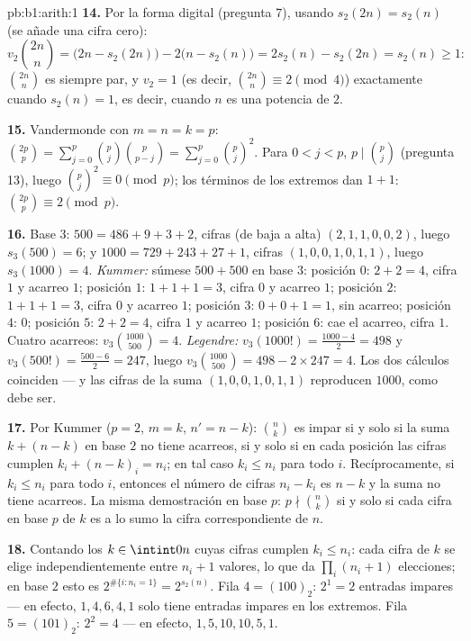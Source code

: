 \begin{solution}{pb:b1:arith:1}
\textbf{14.} Por la forma digital (pregunta 7), usando
$s_2(2n) = s_2(n)$ (se añade una cifra cero):
\[
v_2\binom{2n}n = \bigl(2n - s_2(2n)\bigr) - 2\bigl(n -
s_2(n)\bigr) = 2s_2(n) - s_2(2n) = s_2(n) \geq 1 :
\]
$\binom{2n}n$ es siempre par, y $v_2 = 1$ (es decir,
$\binom{2n}n \equiv 2 \pmod 4$) exactamente cuando $s_2(n) = 1$, es
decir, cuando $n$ es una potencia de $2$.

\textbf{15.} Vandermonde con $m = n = k = p$: $\binom{2p}p =
\sum_{j=0}^p \binom pj\binom p{p-j} = \sum_{j=0}^p \binom pj^2$. Para
$0 < j < p$, $p \mid \binom pj$ (pregunta 13), luego
$\binom pj^2 \equiv 0 \pmod p$; los términos de los extremos dan
$1 + 1$: $\binom{2p}p \equiv 2 \pmod p$.

\textbf{16.} Base $3$: $500 = 486 + 9 + 3 + 2$, cifras (de baja a
alta) $(2, 1, 1, 0, 0, 2)$, luego $s_3(500) = 6$; y
$1000 = 729 + 243 + 27 + 1$, cifras $(1, 0, 0, 1, 0, 1, 1)$, luego
$s_3(1000) = 4$. \emph{Kummer:} súmese $500 + 500$ en base $3$:
posición $0$: $2 + 2 = 4$, cifra $1$ y acarreo $1$; posición $1$:
$1 + 1 + 1 = 3$, cifra $0$ y acarreo $1$; posición $2$:
$1 + 1 + 1 = 3$, cifra $0$ y acarreo $1$; posición $3$:
$0 + 0 + 1 = 1$, sin acarreo; posición $4$: $0$; posición $5$:
$2 + 2 = 4$, cifra $1$ y acarreo $1$; posición $6$: cae el acarreo,
cifra $1$. Cuatro acarreos: $v_3\binom{1000}{500} = 4$.
\emph{Legendre:} $v_3(1000!) = \frac{1000 - 4}2 = 498$ y
$v_3(500!) = \frac{500 - 6}2 = 247$, luego
$v_3\binom{1000}{500} = 498 - 2\times247 = 4$. Los dos cálculos
coinciden --- y las cifras de la suma $(1, 0, 0, 1, 0, 1, 1)$
reproducen $1000$, como debe ser.

\textbf{17.} Por Kummer ($p = 2$, $m = k$, $n' = n - k$): $\binom nk$
es impar si y solo si la suma $k + (n - k)$ en base $2$ no tiene
acarreos, si y solo si en cada posición las cifras cumplen
$k_i + (n - k)_i = n_i$; en tal caso $k_i \leq n_i$ para todo $i$.
Recíprocamente, si $k_i \leq n_i$ para todo $i$, entonces el número de
cifras $n_i - k_i$ es $n - k$ y la suma no tiene acarreos. La misma
demostración en base $p$: $p \nmid \binom nk$ si y solo si cada cifra
en base $p$ de $k$ es a lo sumo la cifra correspondiente de $n$.

\textbf{18.} Contando los $k \in \intint0n$ cuyas cifras cumplen
$k_i \leq n_i$: cada cifra de $k$ se elige independientemente entre
$n_i + 1$ valores, lo que da $\prod_i (n_i + 1)$ elecciones; en base
$2$ esto es $2^{\#\{i : n_i = 1\}} = 2^{s_2(n)}$. Fila $4 = (100)_2$:
$2^1 = 2$ entradas impares --- en efecto, $1, 4, 6, 4, 1$ solo tiene
entradas impares en los extremos. Fila $5 = (101)_2$: $2^2 = 4$ ---
en efecto, $1, 5, 10, 10, 5, 1$.


\end{solution}
